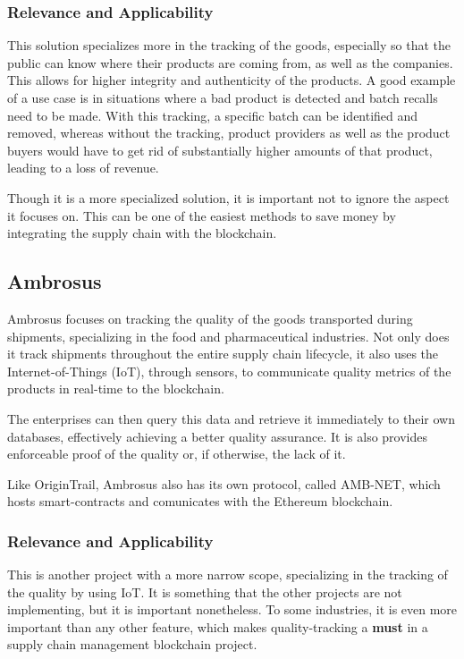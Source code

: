 \subsubsection{Relevance and Applicability}
This solution specializes more in the tracking of the goods, especially so that the public can know where their products are coming from, as well as the companies. This allows for higher integrity and authenticity of the products. A good example of a use case is in situations where a bad product is detected and batch recalls need to be made. With this tracking, a specific batch can be identified and removed, whereas without the tracking, product providers as well as the product buyers would have to get rid of substantially higher amounts of that product, leading to a loss of revenue.

Though it is a more specialized solution, it is important not to ignore the aspect it focuses on. This can be one of the easiest methods to save money by integrating the supply chain with the blockchain.


\subsection{Ambrosus}
Ambrosus focuses on tracking the quality of the goods transported during shipments, specializing in the food and pharmaceutical industries. Not only does it track shipments throughout the entire supply chain lifecycle, it also uses the Internet-of-Things (IoT), through sensors, to communicate quality metrics of the products in real-time to the blockchain. 

The enterprises can then query this data and retrieve it immediately to their own databases, effectively achieving a better quality assurance. It is also provides enforceable proof of the quality or, if otherwise, the lack of it.

Like OriginTrail, Ambrosus also has its own protocol, called AMB-NET, which hosts smart-contracts and comunicates with the Ethereum blockchain.

\subsubsection{Relevance and Applicability}
This is another project with a more narrow scope, specializing in the tracking of the quality by using IoT. It is something that the other projects are not implementing, but it is important nonetheless. To some industries, it is even more important than any other feature, which makes quality-tracking a \textbf{must} in a supply chain management blockchain project.

